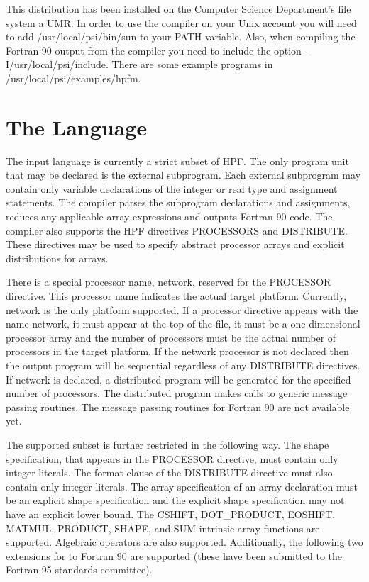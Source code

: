 This distribution has been installed on the Computer Science Department's
file system a UMR.  In order to use the compiler on your Unix account
you will need to add /usr/local/psi/bin/sun to your PATH variable.
Also, when compiling the Fortran 90 output from the compiler you need to 
include the option -I/usr/local/psi/include.
There are some example programs in /usr/local/psi/examples/hpfm.

\section{The Language}
The input language is currently a strict subset of HPF.  
The only program unit that may be declared is the external subprogram.
Each external subprogram may contain only variable declarations of the
integer or real type and assignment statements.
The compiler parses the subprogram declarations and assignments, reduces
any applicable array expressions and outputs Fortran 90 code.  The compiler
also supports the HPF directives PROCESSORS and DISTRIBUTE.  These directives
may be used to specify abstract processor arrays and explicit distributions
for arrays.  

There is a special processor name, network, reserved for the 
PROCESSOR directive.  This processor name indicates the actual target 
platform.  Currently, network is the only platform supported.  If a processor
directive appears with the name network, it must appear at the top of the
file, it must be a one dimensional processor array and the number of processors
must be the actual number of processors in the target platform.  If the
network processor is not declared then the output program will be sequential
regardless of any DISTRIBUTE directives.  If network is declared, a distributed
program will be generated for the specified number of processors.  The
distributed program makes calls to generic message passing routines.  The
message passing routines for Fortran 90 are not available yet.

The supported subset is further restricted in the following way.  The shape
specification, that appears in the PROCESSOR directive, must contain only
integer literals.  The format clause of the DISTRIBUTE directive must also
contain only integer literals.  The array specification of an array
declaration must be an explicit shape specification and the explicit shape
specification may not have an explicit lower bound.  The CSHIFT,
DOT\_PRODUCT, EOSHIFT, MATMUL, PRODUCT, SHAPE, and SUM intrinsic array 
functions are supported.  Algebraic operators are also supported.  
Additionally,
the following two extensions for to Fortran 90 are supported (these have
been submitted to the Fortran 95 standards committee).

